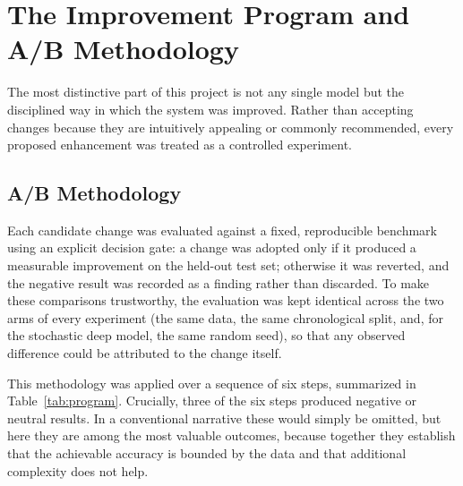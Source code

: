 \section{The Improvement Program and A/B Methodology}

The most distinctive part of this project is not any single model but the disciplined way in which the system was improved. Rather than accepting changes because they are intuitively appealing or commonly recommended, every proposed enhancement was treated as a controlled experiment.

\subsection{A/B Methodology}

Each candidate change was evaluated against a fixed, reproducible benchmark using an explicit decision gate: a change was adopted only if it produced a measurable improvement on the held-out test set; otherwise it was reverted, and the negative result was recorded as a finding rather than discarded. To make these comparisons trustworthy, the evaluation was kept identical across the two arms of every experiment (the same data, the same chronological split, and, for the stochastic deep model, the same random seed), so that any observed difference could be attributed to the change itself.

This methodology was applied over a sequence of six steps, summarized in Table~\ref{tab:program}. Crucially, three of the six steps produced negative or neutral results. In a conventional narrative these would simply be omitted, but here they are among the most valuable outcomes, because together they establish that the achievable accuracy is bounded by the data and that additional complexity does not help.

